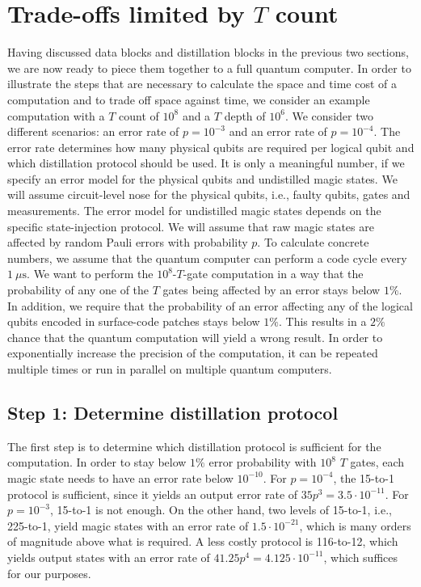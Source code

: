 \documentclass[prx,aps,letterpaper,twocolumn,allowfontchageintitle=true,accepted=2019-02-01]{quantumarticle}
\begin{document}
\section{Trade-offs limited by $T$ count}
\label{sec:tcount}

Having discussed data blocks and distillation blocks in the previous two sections, we are now ready to piece them together to a full quantum computer. In order to illustrate the steps that are necessary to calculate the space and time cost of a computation and to trade off space against time, we consider an example computation with a $T$ count of $10^8$ and a $T$ depth of $10^6$. We consider two different scenarios: an error rate of $p=10^{-3}$ and an error rate of $p=10^{-4}$. The error rate determines how many physical qubits are required per logical qubit and which distillation protocol should be used. It is only a meaningful number, if we specify an error model for the physical qubits and undistilled magic states. We will assume circuit-level nose for the physical qubits, i.e., faulty qubits, gates and measurements. The error model for undistilled magic states depends on the specific state-injection protocol. We will assume that raw magic states are affected by random Pauli errors with probability $p$. To calculate concrete numbers, we assume that the quantum computer can perform a code cycle every $1~\mu\mathrm{s}$. We want to perform the $10^8$-$T$-gate computation in a way that the probability of any one of the $T$ gates being affected by an error stays below $1\%$. In addition, we require that the probability of an error affecting any of the logical qubits encoded in surface-code patches stays below $1\%$. This results in a $2\%$ chance that the quantum computation will yield a wrong result. In order to exponentially increase the precision of the computation, it can be repeated multiple times or run in parallel on multiple quantum computers.

\subsection{Step 1: Determine distillation protocol}

The first step is to determine which distillation protocol is sufficient for the computation. In order to stay below $1\%$ error probability with $10^8$ $T$ gates, each magic state needs to have an error rate below $10^{-10}$. For $p=10^{-4}$, the 15-to-1 protocol is sufficient, since it yields an output error rate of $35p^3 = 3.5\cdot 10^{-11}$. For $p=10^{-3}$, 15-to-1 is not enough. On the other hand, two levels of 15-to-1, i.e., 225-to-1, yield magic states with an error rate of $1.5 \cdot 10^{-21}$, which is many orders of magnitude above what is required. A less costly protocol is 116-to-12, which yields output states with an error rate of $41.25p^4 = 4.125 \cdot 10^{-11}$, which suffices for our purposes.
\end{document}
